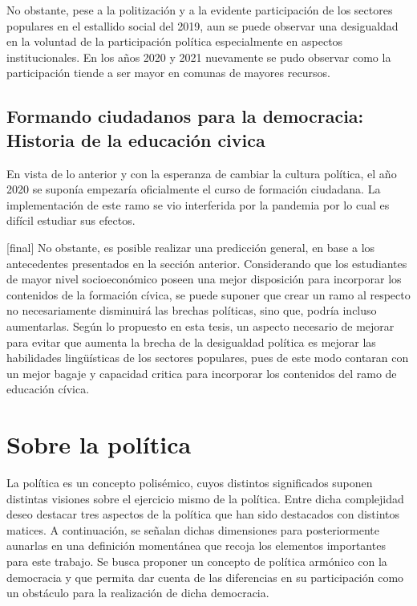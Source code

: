 \documentclass[12pt,twoside]{templates/facsothesis}
\begin{document}
No obstante, pese a la politización y a la evidente participación de los sectores populares en el estallido social del 2019, aun se puede observar una desigualdad en la voluntad de la participación política especialmente en aspectos institucionales. En los años 2020 y 2021 nuevamente se pudo observar como la participación tiende a ser mayor en comunas de mayores recursos.

\hypertarget{formando-ciudadanos-para-la-democracia-historia-de-la-educaciuxf3n-civica}{%
\subsection{Formando ciudadanos para la democracia: Historia de la educación civica}\label{formando-ciudadanos-para-la-democracia-historia-de-la-educaciuxf3n-civica}}

En vista de lo anterior y con la esperanza de cambiar la cultura política, el año 2020 se suponía empezaría oficialmente el curso de formación ciudadana. La implementación de este ramo se vio interferida por la pandemia por lo cual es difícil estudiar sus efectos.

{[}final{]} No obstante, es posible realizar una predicción general, en base a los antecedentes presentados en la sección anterior. Considerando que los estudiantes de mayor nivel socioeconómico poseen una mejor disposición para incorporar los contenidos de la formación cívica, se puede suponer que crear un ramo al respecto no necesariamente disminuirá las brechas políticas, sino que, podría incluso aumentarlas. Según lo propuesto en esta tesis, un aspecto necesario de mejorar para evitar que aumenta la brecha de la desigualdad política es mejorar las habilidades lingüísticas de los sectores populares, pues de este modo contaran con un mejor bagaje y capacidad critica para incorporar los contenidos del ramo de educación cívica.

\hypertarget{sobre-la-poluxedtica}{%
\section{Sobre la política}\label{sobre-la-poluxedtica}}

La política es un concepto polisémico, cuyos distintos significados suponen distintas visiones sobre el ejercicio mismo de la política. Entre dicha complejidad deseo destacar tres aspectos de la política que han sido destacados con distintos matices. A continuación, se señalan dichas dimensiones para posteriormente aunarlas en una definición momentánea que recoja los elementos importantes para este trabajo. Se busca proponer un concepto de política armónico con la democracia y que permita dar cuenta de las diferencias en su participación como un obstáculo para la realización de dicha democracia.
\end{document}
